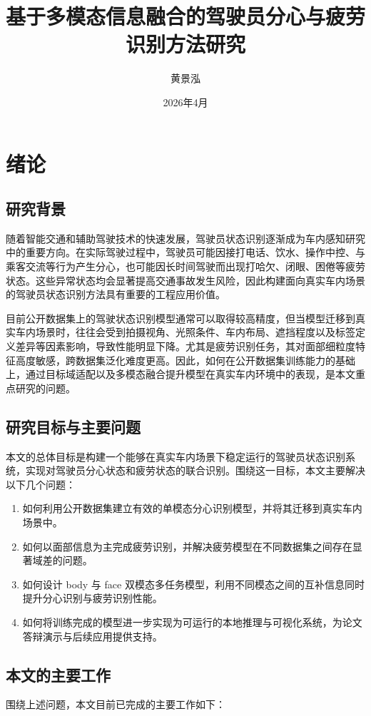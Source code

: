 \documentclass[12pt]{ctexrep}
\title{基于多模态信息融合的驾驶员分心与疲劳识别方法研究}
\author{黄景泓}
\date{2026年4月}
\begin{document}
\maketitle
\tableofcontents
\clearpage

\chapter{绪论}

\section{研究背景}
随着智能交通和辅助驾驶技术的快速发展，驾驶员状态识别逐渐成为车内感知研究中的重要方向。在实际驾驶过程中，驾驶员可能因接打电话、饮水、操作中控、与乘客交流等行为产生分心，也可能因长时间驾驶而出现打哈欠、闭眼、困倦等疲劳状态。这些异常状态均会显著提高交通事故发生风险，因此构建面向真实车内场景的驾驶员状态识别方法具有重要的工程应用价值。

目前公开数据集上的驾驶状态识别模型通常可以取得较高精度，但当模型迁移到真实车内场景时，往往会受到拍摄视角、光照条件、车内布局、遮挡程度以及标签定义差异等因素影响，导致性能明显下降。尤其是疲劳识别任务，其对面部细粒度特征高度敏感，跨数据集泛化难度更高。因此，如何在公开数据集训练能力的基础上，通过目标域适配以及多模态融合提升模型在真实车内环境中的表现，是本文重点研究的问题。

\section{研究目标与主要问题}
本文的总体目标是构建一个能够在真实车内场景下稳定运行的驾驶员状态识别系统，实现对驾驶员分心状态和疲劳状态的联合识别。围绕这一目标，本文主要解决以下几个问题：

\begin{enumerate}
    \item 如何利用公开数据集建立有效的单模态分心识别模型，并将其迁移到真实车内场景中。
    \item 如何以面部信息为主完成疲劳识别，并解决疲劳模型在不同数据集之间存在显著域差的问题。
    \item 如何设计 body 与 face 双模态多任务模型，利用不同模态之间的互补信息同时提升分心识别与疲劳识别性能。
    \item 如何将训练完成的模型进一步实现为可运行的本地推理与可视化系统，为论文答辩演示与后续应用提供支持。
\end{enumerate}

\section{本文的主要工作}
围绕上述问题，本文目前已完成的主要工作如下：
\end{document}
